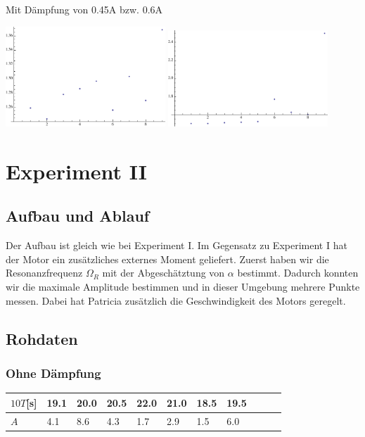 \documentclass[12pt,a4paper]{article}
\begin{document}
\newpage
Mit D\"ampfung von 0.45A bzw. 0.6A
\begin{center}
\includegraphics[width=6cm]{plot12.pdf}
\includegraphics[width=6cm]{plot13.pdf}
\end{center}

\section*{Experiment II}

\subsection*{Aufbau und Ablauf}
Der Aufbau ist gleich wie bei Experiment I. Im Gegensatz zu Experiment I hat der Motor ein zus\"atzliches externes Moment geliefert. 
Zuerst haben wir die Resonanzfrequenz $\Omega_R$ mit der Abgesch\"atztung von $\alpha$ bestimmt. Dadurch konnten wir die maximale Amplitude bestimmen und in dieser Umgebung mehrere Punkte messen.
Dabei hat Patricia zus\"atzlich die Geschwindigkeit des Motors geregelt.

\subsection*{Rohdaten}
\subsubsection*{Ohne D\"ampfung}
\begin{tabular}{|l|l|l|l|l|l|l|l|l|l|l|}
\hline
$10T$[s]&19.1&20.0&20.5&22.0&21.0&18.5&19.5\\
\hline
$A$&4.1&8.6&4.3&1.7&2.9&1.5&6.0\\
\hline
\end{tabular}
\end{document}
